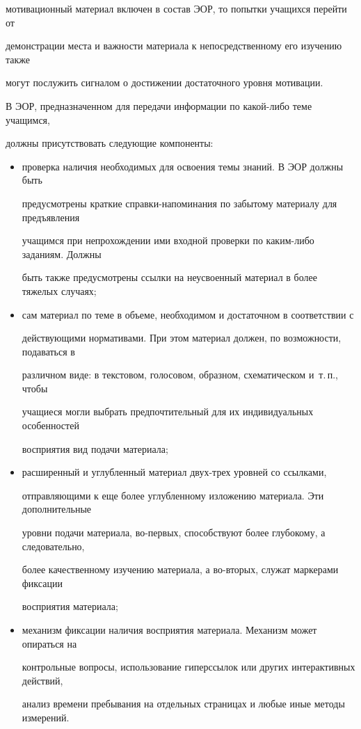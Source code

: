 мотивационный материал включен в состав ЭОР, то попытки учащихся перейти от 


демонстрации места и важности материала к непосредственному его изучению также 


могут послужить сигналом о достижении достаточного уровня мотивации.





В ЭОР, предназначенном для передачи информации по какой-либо теме учащимся, 


должны присутствовать следующие компоненты:


\begin{itemize}


\item проверка наличия необходимых для освоения темы знаний. В ЭОР должны быть 


предусмотрены краткие справ\-ки-на\-по\-ми\-на\-ния по забытому материалу для предъявления 


учащимся при непрохождении ими входной проверки по ка\-ким-ли\-бо заданиям. Должны 


быть также предусмотрены ссылки на неусвоенный материал в более тяжелых случаях;


\item сам материал по теме в объеме, необходимом и достаточном в соответствии с 


действующими нормативами. При этом материал должен, по возможности, подаваться в 


различном виде: в текстовом, голосовом, образном, схематическом и~т.\,п., чтобы 


учащиеся могли выбрать предпочтительный для их индивидуальных особенностей 


восприятия вид подачи материала;


\item расширенный и углубленный материал двух-трех уровней со ссылками, 


отправляющими к еще более углубленному изложению материала. Эти дополнительные 


уровни подачи материала, во-пер\-вых, способствуют более глубокому, а следовательно, 


более качественному изучению материала, а во-вто\-рых, служат маркерами фиксации 


восприятия материала;


\item механизм фиксации наличия восприятия материала. Механизм может опираться на 


контрольные вопросы, использование гиперссылок или других интерактивных действий, 


анализ времени пребывания на отдельных страницах и любые иные методы измерений.


\end{itemize}





